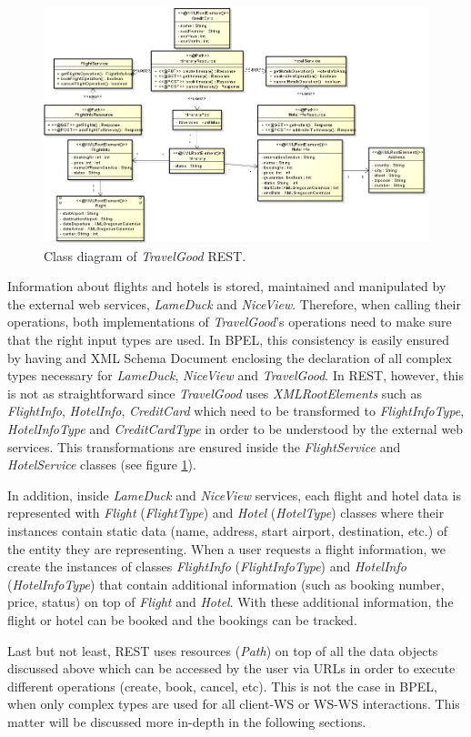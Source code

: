 \begin{figure}[H]
\centering
\includegraphics[width=\textwidth]{images/REST}
\caption{Class diagram of \textit{TravelGood} REST.}
\label{classdiagramREST}
\end{figure}

Information about flights and hotels is stored, maintained and manipulated by the external web services, \textit{LameDuck} and \textit{NiceView}. Therefore, when calling their operations, both implementations of \textit{TravelGood}’s operations need to make sure that the right input types are used. In BPEL, this consistency is easily ensured by having and XML Schema Document enclosing the declaration of all complex types necessary for \textit{LameDuck}, \textit{NiceView} and \textit{TravelGood}. In REST, however, this is not as straightforward since \textit{TravelGood} uses \textit{XMLRootElements} such as \textit{FlightInfo}, \textit{HotelInfo}, \textit{CreditCard} which need to be transformed to \textit{FlightInfoType}, \textit{HotelInfoType} and \textit{CreditCardType} in order to be understood by the external web services. This transformations are ensured inside the \textit{FlightService} and \textit{HotelService} classes (see figure \ref{classdiagramREST}).

In addition, inside \textit{LameDuck} and \textit{NiceView} services, each flight and hotel data is represented with \textit{Flight} (\textit{FlightType}) and \textit{Hotel} (\textit{HotelType}) classes where their instances contain static data (name, address, start airport, destination, etc.) of the entity they are representing. When a user requests a flight information, we create the instances of classes \textit{FlightInfo} (\textit{FlightInfoType}) and \textit{HotelInfo} (\textit{HotelInfoType}) that contain additional information (such as booking number, price, status) on top of \textit{Flight} and \textit{Hotel}. With these additional information, the flight or hotel can be booked and the bookings can be tracked. 

Last but not least, REST uses resources (\textit{\@ Path}) on top of all the data objects discussed above which can be accessed by the user via URLs in order to execute different operations (create, book, cancel, etc). This is not the case in BPEL, when only complex types are used for all client-WS or WS-WS interactions. This matter will be discussed more in-depth in the following sections.
